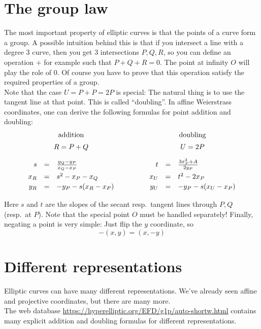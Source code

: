 \documentclass[12pt,draft,a4paper,openany,oneside]{amsbook}
\def\qquad{\quad\quad}
\theoremstyle{plain}
\theoremstyle{definition}
\begin{document}
\section{The group law}

The most important property of elliptic curves is that the points of a curve form a group.
A possible intuition behind this is that if you intersect a line with a degree 3 curve,
then you get 3 intersections $P,Q,R$, so you can define an operation $+$ for example
such that $P+Q+R=0$. The point at infinity $O$ will play the role of $0$. Of course
you have to prove that this operation satisfy the required properties of a group.\\

Note that the case $U=P+P=2P$ is special: The natural thing is to use the tangent line at
that point. This is called ``doubling''. In affine Weierstrass coordinates, one can
derive the following formulas for point addition and doubling:\\
\[
\begin{array}{rclcrcl}
\multicolumn{3}{c}{\textrm{addition}} &
\multicolumn{1}{c}{\qquad} &
\multicolumn{3}{c}{\textrm{doubling}} \\[5pt]
\multicolumn{3}{c}{R=P+Q}  &
\multicolumn{1}{c}{\qquad} &
\multicolumn{3}{c}{U=2P}   \\[10pt]
 s   &=& \frac{y_Q-y_P}{x_Q-x_P}  & \quad\quad\quad &  t   &=& \frac{3x_P^2+A}{2 y_P}  \\[5pt]
 x_R &=&  s^2 - x_P - x_Q         & \quad\quad\quad &  x_U &=&  t^2 - 2x_P             \\[2pt]
 y_R &=& -y_P - s(x_R - x_P)      & \quad\quad\quad &  y_U &=& - y_P - s(x_U - x_P)    \\[5pt]
\end{array}
\]
Here $s$ and $t$ are the slopes of the secant resp.~tangent lines through $P,Q$
(resp.~at $P$). Note that the special point $O$ must be handled separately!
Finally, negating a point is very simple: Just flip the $y$ coordinate, so 
\[ -(x,y) = (x,-y) \]

\section{Different representations}

Elliptic curves can have many different representations. We've already seen
affine and projective coordinates, but there are many more.\\

The web database \url{https://hyperelliptic.org/EFD/g1p/auto-shortw.html} 
contains many explicit addition and doubling formulas for different representations.
\end{document}

